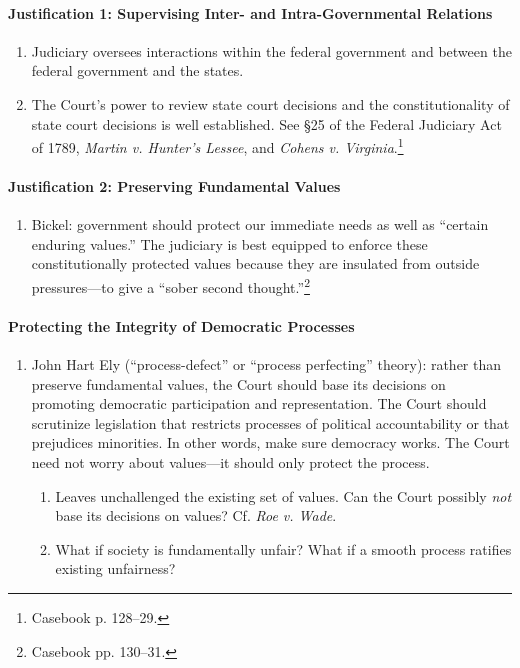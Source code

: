 \begin{enumerate}
\paragraph{Justification 1: Supervising Inter- and Intra-Governmental 
Relations}

\begin{enumerate}
    \item Judiciary oversees interactions within the federal government and 
    between the federal government and the states.
    \item The Court's power to review state court decisions and the 
    constitutionality of state court decisions is well established. See \S 25 
    of the Federal Judiciary Act of 1789, \emph{Martin v. Hunter's Lessee}, 
    and \emph{Cohens v. Virginia}.\footnote{Casebook p. 128--29.}
\end{enumerate}

\paragraph{Justification 2: Preserving Fundamental Values}

\begin{enumerate}
    \item Bickel: government should protect our immediate needs as well as 
    ``certain enduring values.'' The judiciary is best equipped to enforce 
    these constitutionally protected values because they are insulated from 
    outside pressures---to give a ``sober second thought.''\footnote{Casebook 
    pp. 130--31.}
\end{enumerate}

\paragraph{Protecting the Integrity of Democratic Processes}

\begin{enumerate}
    \item John Hart Ely (``process-defect'' or ``process perfecting'' theory): 
    rather than preserve fundamental values, the Court should base its 
    decisions on promoting democratic participation and representation. The 
    Court should scrutinize legislation that restricts processes of political 
    accountability or that prejudices minorities. In other words, make sure 
    democracy works.  The Court need not worry about values---it should only 
    protect the process.
    \begin{enumerate}
        \item Leaves unchallenged the existing set of values. Can the Court 
        possibly \emph{not} base its decisions on values? Cf. \emph{Roe v. 
        Wade}.
        \item What if society is fundamentally unfair? What if a smooth 
        process ratifies existing unfairness?
    \end{enumerate}
\end{enumerate}


\end{enumerate}
